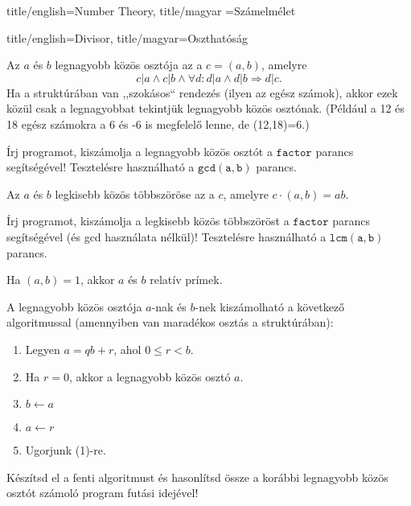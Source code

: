 \documentclass{amsbook}
\begin{document}
\begin{Part*}{
    title/english=Number Theory,
    title/magyar =Számelmélet}
\begin{Section}{
    title/english=Divisor,
    title/magyar=Oszthatóság}
  \begin{definition}
    Az $a$ és $b$ legnagyobb közös osztója az a $c = (a,b)$, amelyre
    \[ c|a \wedge c|b \wedge \forall d: d|a \wedge d|b \Rightarrow d|c. \]
    Ha a struktúrában van ,,szokásos`` rendezés (ilyen az egész számok), akkor ezek 
    közül csak a legnagyobbat tekintjük legnagyobb közös osztónak. (Például a 12
    és 18 egész számokra a 6 és -6 is megfelelő lenne, de (12,18)=6.)
  \end{definition}

  \begin{exercise}
    Írj programot, kiszámolja a legnagyobb közös osztót a $\mathtt{factor}$
    parancs segítségével! Tesztelésre használható a $\mathtt{gcd(a,b)}$ parancs.
  \end{exercise}

  \begin{definition}
    Az $a$ és $b$ legkisebb közös többszöröse az a $c$, amelyre $c\cdot(a,b)=ab$.
  \end{definition}

  \begin{exercise}
    Írj programot, kiszámolja a legkisebb közös többszöröst a $\mathtt{factor}$
    parancs segítségével (és gcd használata nélkül)! Tesztelésre használható a
    $\mathtt{lcm(a,b)}$ parancs.
  \end{exercise}

  \begin{definition}
    Ha $(a,b)=1$, akkor $a$ és $b$ relatív prímek.
  \end{definition}

  \begin{definition} A legnagyobb közös
    osztója $a$-nak és $b$-nek kiszámolható a következ\H o algoritmussal
    (amennyiben van maradékos osztás a struktúrában):
    \begin{enumerate}
      \item Legyen $a = qb + r$, ahol $0 \le r < b$. 
      \item Ha $r = 0$, akkor a legnagyobb közös osztó $a$.
      \item $b \leftarrow a$
      \item $a \leftarrow  r$
      \item Ugorjunk (1)-re.
    \end{enumerate}
  \end{definition}

  \begin{exercise}
    Készítsd el a fenti algoritmust és hasonlítsd össze a korábbi legnagyobb
    közös osztót számoló program futási idejével!
  \end{exercise}
  

\end{Section}
\end{Part*}
\end{document}
